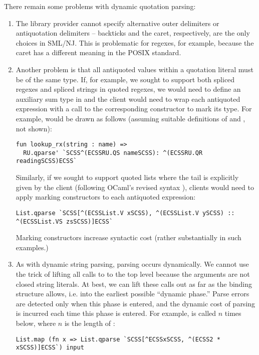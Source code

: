 There remain some problems with dynamic quotation parsing:
\begin{enumerate}
\item The library provider cannot specify alternative outer delimiters or antiquotation delimiters -- backticks and the caret, respectively, are the only choices in SML/NJ. This is problematic for regexes, for example, because the caret has a different meaning in the POSIX standard.

\item Another problem is that all antiquoted values within a quotation literal must be of the same type. If, for example, we sought to support both spliced regexes and spliced strings in quoted regexes, we would need to define an auxiliary sum type in  
and the client would need to wrap each antiquoted expression with a call to the corresponding constructor to mark its type. 
For example,  would be drawn as follows (assuming suitable definitions of  and , not shown):
\begin{lstlisting}[numbers=none]
fun lookup_rx(string : name) =>
  RU.qparse' `SCSS^(ECSSRU.QS nameSCSS): ^(ECSSRU.QR readingSCSS)ECSS`
\end{lstlisting}
Similarly, if we sought to support quoted lists where the tail is explicitly given by the client (following OCaml's revised syntax \cite{ocaml-manual}), clients would need to apply marking constructors to each antiquoted expression:
\begin{lstlisting}[numbers=none]
List.qparse `SCSS[^(ECSSList.V xSCSS), ^(ECSSList.V ySCSS) :: ^(ECSSList.VS zsSCSS)]ECSS`
\end{lstlisting}
Marking constructors increase syntactic cost (rather substantially in such examples.)

\item As with dynamic string parsing, parsing occurs dynamically. We cannot use the trick of lifting all calls to  to the top level because the arguments are not closed string literals. At best, we can lift these calls out as far as the binding structure allows, i.e. into the earliest possible ``dynamic phase.'' Parse errors are detected only when this phase is entered, and the dynamic cost of parsing is incurred each time this phase is entered. For example,  is called $n$ times below, where $n$ is the length of :
\begin{lstlisting}[numbers=none]
List.map (fn x => List.qparse `SCSS[^ECSSxSCSS, ^(ECSS2 * xSCSS)]ECSS`) input
\end{lstlisting}


\end{enumerate}
